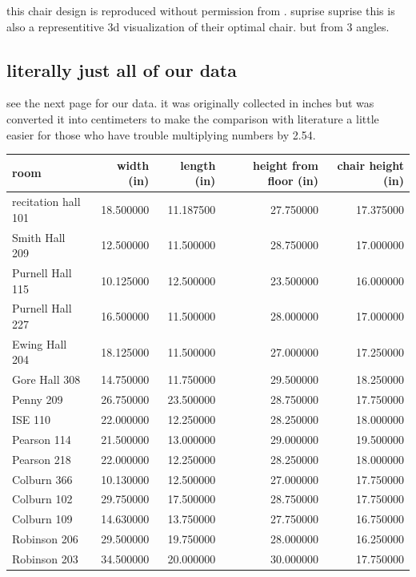 \documentclass[conference]{IEEEtran}
\begin{document}
this chair design is reproduced without permission from \cite{Ansari}. suprise suprise this is also a representitive 3d visualization of their optimal chair. but from 3 angles. 

\subsection{literally just all of our data}
see the next page for our data. it was originally collected in inches but was converted it into centimeters to make the comparison with literature a little easier for those who have trouble multiplying numbers by 2.54.



\clearpage
\onecolumn
\begin{tabular}{lrrrr}
    \toprule
    room & width (in) & length (in) & height from floor (in) & chair height (in) \\
    \midrule
    recitation hall 101 & 18.500000 & 11.187500 & 27.750000 & 17.375000 \\
    Smith Hall 209 & 12.500000 & 11.500000 & 28.750000 & 17.000000 \\
    Purnell Hall 115 & 10.125000 & 12.500000 & 23.500000 & 16.000000 \\
    Purnell Hall 227 & 16.500000 & 11.500000 & 28.000000 & 17.000000 \\
    Ewing Hall 204 & 18.125000 & 11.500000 & 27.000000 & 17.250000 \\
    Gore Hall 308 & 14.750000 & 11.750000 & 29.500000 & 18.250000 \\
    Penny 209 & 26.750000 & 23.500000 & 28.750000 & 17.750000 \\
    ISE 110 & 22.000000 & 12.250000 & 28.250000 & 18.000000 \\
    Pearson 114 & 21.500000 & 13.000000 & 29.000000 & 19.500000 \\
    Pearson 218 & 22.000000 & 12.250000 & 28.250000 & 18.000000 \\
    Colburn 366 & 10.130000 & 12.500000 & 27.000000 & 17.750000 \\
    Colburn 102 & 29.750000 & 17.500000 & 28.750000 & 17.750000 \\
    Colburn 109 & 14.630000 & 13.750000 & 27.750000 & 16.750000 \\
    Robinson 206 & 29.500000 & 19.750000 & 28.000000 & 16.250000 \\
    Robinson 203 & 34.500000 & 20.000000 & 30.000000 & 17.750000 \\

\end{tabular}
\end{document}
